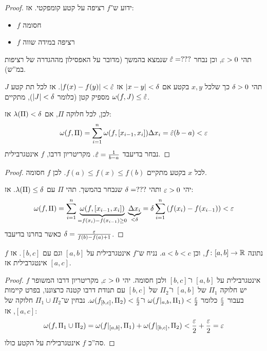 \documentclass[]{../../../../tex/classes/styledArticle}
\begin{document}
	\begin{proof}
		ידוע ש־$f$ רציפה על קטע קומפקטי. אז:
		\begin{itemize}
			\item $f$ חסומה
			\item $f$ רציפה במידה שווה
		\end{itemize}
		תהי $\eg > 0$, וכן נבחר $\hat \eg = ???$ שנמצא בהמשך (מדובר על האפסילון מההגדרה של רציפות במ''ש). 
		
		תהי $\delta > 0$ כך שלכל $x, y$ בקטע אם $\left \lvert x - y \right \rvert < \delta$ אז $\sof{f(x) - f(y)} < \hat \eg$. אז לכל תת קטע $J$ מספיק קטן (כלומר $\left \lvert J \right \rvert < \delta$), מתקיים $\wg(f, J) \le \hat \eg$. 
		
		לכן, לכל חלוקה $\Pi$, אם $\lambda(\Pi) < \delta$ אז: 
		\[ \wg(f, \Pi) = \sumnio \wg(f, [x_{i - 1}, x_i])\Delta x_i = \hat \eg(b - a) < \eg \]
		נבחר בדיעבד $\hat \eg = \frac{1}{b - a}$. מקריטריון דרבו, $f$ אינטגרבילית. 
	\end{proof}
	
	\begin{proof}
		לכל $x$ בקטע מתקיים $f(a) \le f(x) \le f(b)$. לכן $f$ חסומה. 
		
		יהי $\eg> 0$ ותהי $\delta = ???$ שנבחר בהמשך. תהי $\Pi$ עם $\lambda(\Pi) \le \delta$. אז: 
		\[ \wg(f, \Pi) = \sumnio \underbrace{\wg(f, [x_{i - 1}, x_i])}_{=f(x_i) - f(x_{i - 1}) \ge 0}\underbrace{\Delta x_i}_{< \dg} = \dg \sumnio \cl{f(x_i) - f(x_{i - 1})} < \eg \]
		כאשר בחרנו בדיעבד $\dg = \frac{\eg}{f(b) - f(a) + 1}$. 
	\end{proof}
	
	\begin{Theorem}
		נתונה $f \colon [a, b] \to \mathbb{R}$, וכן $a < b < c$. נניח ש־$f$ אינטגרבילית על $[a, b]$ וגם עם $[b, c]$. אז $f$ אינטגרבילית אז $[a, c]$. 
	\end{Theorem}
	\begin{proof}
		$f$ אינטגרבילית על $[a, b]$ ו־$[b, c]$ ולכן חסומה. יהי $\eg > 0$, מקריטריון דרבו המשופר יש חלוקה $\Pi_1$ של $[a, b]$ ו־$\Pi_2 $ של $[b, c]$ עם תנודת דרבו קטנה כרצוננו, בפרט קיימות בעבור $\frac{\eg}{2}$ כלומר $\wg(f|_{a, b}, \Pi_1) < \frac{\eg}{2}$ ו־$\wg(f_{[b, c]}, \Pi_2) < \frac{\eg}{2}$. נבחין ש־$\Pi_1 \cup \Pi_2$ חלוקה של $[a, c]$, אז: 
		\[ \wg(f, \Pi_1 \cup \Pi_2)  = \wg(f|_{[a, b]}, \Pi_1) + \wg(f|_{[b, c]}, \Pi_2) < \frac{\eg}{2} + \frac{\eg}{2} = \eg \]
		סה''כ $f$ אינטגרבילית על הקטע כולו. 
	\end{proof}
	
\end{document}
